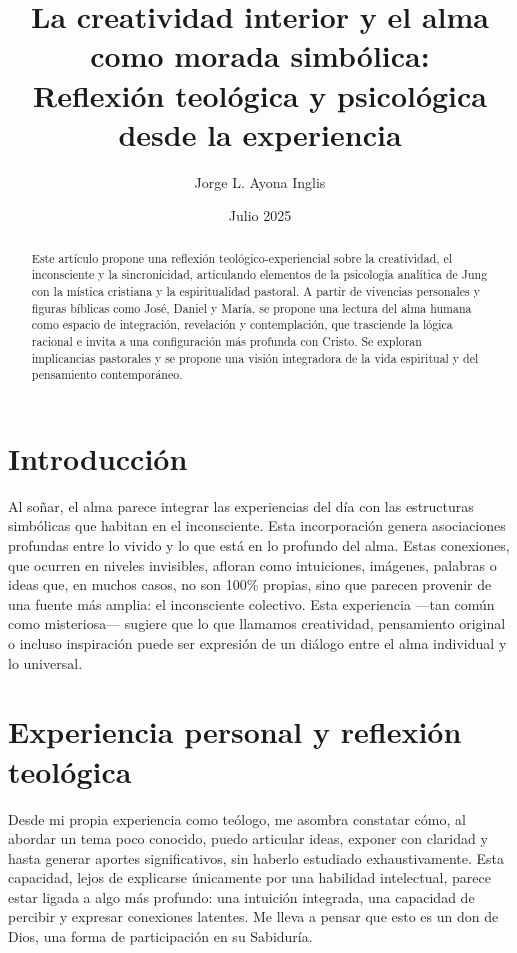 \documentclass[12pt]{article}
\title{La creatividad interior y el alma como morada simbólica: \\ Reflexión teológica y psicológica desde la experiencia}
\author{Jorge L. Ayona Inglis}
\date{Julio 2025}
\begin{document}
\maketitle

\begin{abstract}
Este artículo propone una reflexión teológico-experiencial sobre la creatividad, el inconsciente y la sincronicidad, articulando elementos de la psicología analítica de Jung con la mística cristiana y la espiritualidad pastoral. A partir de vivencias personales y figuras bíblicas como José, Daniel y María, se propone una lectura del alma humana como espacio de integración, revelación y contemplación, que trasciende la lógica racional e invita a una configuración más profunda con Cristo. Se exploran implicancias pastorales y se propone una visión integradora de la vida espiritual y del pensamiento contemporáneo.
\end{abstract}

\section*{Introducción}

Al soñar, el alma parece integrar las experiencias del día con las estructuras simbólicas que habitan en el inconsciente. Esta incorporación genera asociaciones profundas entre lo vivido y lo que está en lo profundo del alma. Estas conexiones, que ocurren en niveles invisibles, afloran como intuiciones, imágenes, palabras o ideas que, en muchos casos, no son 100\% propias, sino que parecen provenir de una fuente más amplia: el inconsciente colectivo. Esta experiencia —tan común como misteriosa— sugiere que lo que llamamos creatividad, pensamiento original o incluso inspiración puede ser expresión de un diálogo entre el alma individual y lo universal.

\section*{Experiencia personal y reflexión teológica}

Desde mi propia experiencia como teólogo, me asombra constatar cómo, al abordar un tema poco conocido, puedo articular ideas, exponer con claridad y hasta generar aportes significativos, sin haberlo estudiado exhaustivamente. Esta capacidad, lejos de explicarse únicamente por una habilidad intelectual, parece estar ligada a algo más profundo: una intuición integrada, una capacidad de percibir y expresar conexiones latentes. Me lleva a pensar que esto es un don de Dios, una forma de participación en su Sabiduría.
\end{document}
